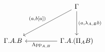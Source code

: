 \[\begin{tikzcd}
	&& \Gamma \\
	\\
	{\Gamma.A.B} && {\Gamma.A.(\Pi_{A}B)}
	\arrow["{(a,\lambda_{A,B}b)}", from=1-3, to=3-3]
	\arrow["{\app_{A,B}}", from=3-3, to=3-1]
	\arrow["{(a,b[a])}"', from=1-3, to=3-1]
\end{tikzcd}\]